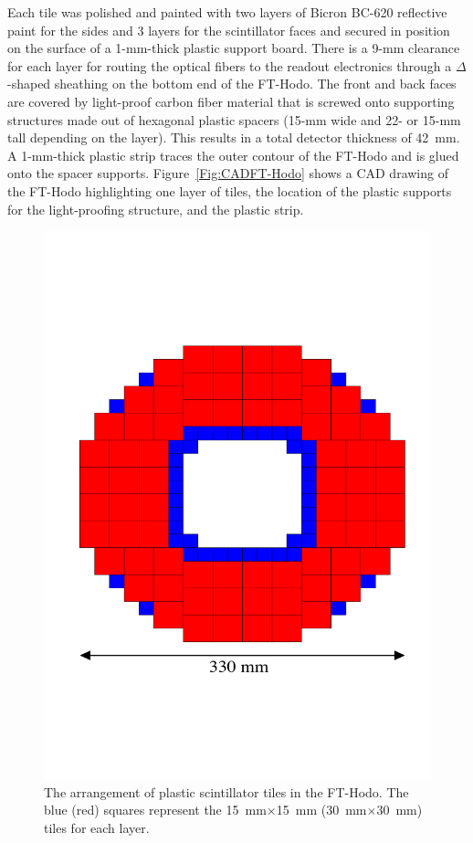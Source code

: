 Each tile was polished and painted with two layers of Bicron BC-620 reflective paint for the sides and 3 layers for
the scintillator faces and secured in position on the surface of a 1-mm-thick plastic support board. There is a 9-mm
clearance for each layer for routing the optical fibers to the readout electronics through a $\Delta$-shaped
sheathing on the bottom end of the FT-Hodo. The front and back faces are covered by light-proof carbon fiber
material that is screwed onto supporting structures made out of hexagonal plastic spacers (15-mm wide and 22- or
15-mm tall depending on the layer). This results in a total detector thickness of 42~mm. A 1-mm-thick plastic strip
traces the outer contour of the FT-Hodo and is glued onto the spacer supports. Figure~\ref{Fig:CADFT-Hodo} shows
a CAD drawing of the FT-Hodo highlighting one layer of tiles, the location of the plastic supports for the light-proofing
structure, and the plastic strip.  

\begin{figure}[th!]
\centering 
\includegraphics[width=0.85\columnwidth]{./fig/FTHodoLayout.pdf} 
\caption{The arrangement of plastic scintillator tiles in the FT-Hodo. The blue (red) squares represent the
  15~mm$\times$15~mm (30~mm$\times$30~mm) tiles for each layer.} 
\label{Fig:FTHodoLayout} 
\end{figure}

